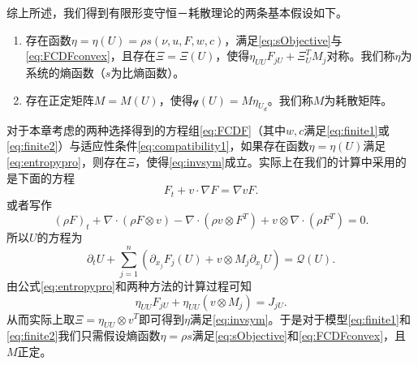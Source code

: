 综上所述，我们得到有限形变守恒－耗散理论的两条基本假设如下。
\begin{enumerate}
		\item 存在函数$\eta = \eta (U) = \rho s(\nu,u,F,w,c)$，满足\eqref{eq:sObjective}与\eqref{eq:FCDFconvex}，且存在$\Xi=\Xi(U)$，使得$\eta_{UU} F_{jU} + \Xi_U^T M_j $对称。我们称$\eta$为系统的熵函数（$s$为比熵函数）。
		\item 存在正定矩阵$M = M(U)$，使得$\mathcal{q}(U) = M \eta_{U_d}$。我们称$M$为耗散矩阵。
\end{enumerate}

对于本章考虑的两种选择得到的方程组\eqref{eq:FCDF}（其中$w,c$满足\eqref{eq:finite1}或\eqref{eq:finite2}）与适应性条件\eqref{eq:compatibility1}，如果存在函数$\eta = \eta(U)$满足\eqref{eq:entropypro}，则存在$\Xi$，使得\eqref{eq:invsym}成立。实际上在我们的计算中采用的是下面的方程
\begin{equation*}
	F_t + v  \cdot \nabla F = \nabla v F.
\end{equation*}
或者写作
\begin{equation*}
(\rho F)_t + \nabla \cdot (\rho F \otimes v) - \nabla \cdot (\rho v \otimes F^T) + v \otimes \nabla \cdot (\rho F^T) = 0 .
\end{equation*}
所以$U$的方程为
\begin{equation*}
	\partial_t U + \sum_{j=1}^n (\partial_{x_j} F_j(U) + v\otimes M_j \partial_{x_j} U)= \mathcal{Q} (U) .
\end{equation*}
由公式\eqref{eq:entropypro}和两种方法的计算过程可知
\begin{equation*}
	\eta_{UU} F_{jU} + \eta_{UU} (v \otimes M_{j}) = J_{jU}.
\end{equation*}
从而实际上取$\Xi = \eta_{UU} \otimes v^T$即可得到$\eta$满足\eqref{eq:invsym}。于是对于模型\eqref{eq:finite1}和\eqref{eq:finite2}我们只需假设熵函数$\eta = \rho s$满足\eqref{eq:sObjective}和\eqref{eq:FCDFconvex}，且$M$正定。

